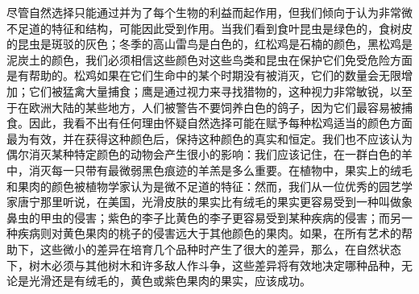\documentclass{article}
\begin{document}
尽管自然选择只能通过并为了每个生物的利益而起作用，但我们倾向于认为非常微不足道的特征和结构，可能因此受到作用。当我们看到食叶昆虫是绿色的，食树皮的昆虫是斑驳的灰色；冬季的高山雷鸟是白色的，红松鸡是石楠的颜色，黑松鸡是泥炭土的颜色，我们必须相信这些颜色对这些鸟类和昆虫在保护它们免受危险方面是有帮助的。松鸡如果在它们生命中的某个时期没有被消灭，它们的数量会无限增加；它们被猛禽大量捕食；鹰是通过视力来寻找猎物的，这种视力非常敏锐，以至于在欧洲大陆的某些地方，人们被警告不要饲养白色的鸽子，因为它们最容易被捕食。因此，我看不出有任何理由怀疑自然选择可能在赋予每种松鸡适当的颜色方面最为有效，并在获得这种颜色后，保持这种颜色的真实和恒定。我们也不应该认为偶尔消灭某种特定颜色的动物会产生很小的影响：我们应该记住，在一群白色的羊中，消灭每一只带有最微弱黑色痕迹的羊羔是多么重要。在植物中，果实上的绒毛和果肉的颜色被植物学家认为是微不足道的特征：然而，我们从一位优秀的园艺学家唐宁那里听说，在美国，光滑皮肤的果实比有绒毛的果实更容易受到一种叫做象鼻虫的甲虫的侵害；紫色的李子比黄色的李子更容易受到某种疾病的侵害；而另一种疾病则对黄色果肉的桃子的侵害远大于其他颜色的果肉。如果，在所有艺术的帮助下，这些微小的差异在培育几个品种时产生了很大的差异，那么，在自然状态下，树木必须与其他树木和许多敌人作斗争，这些差异将有效地决定哪种品种，无论是光滑还是有绒毛的，黄色或紫色果肉的果实，应该成功。
\end{document}
